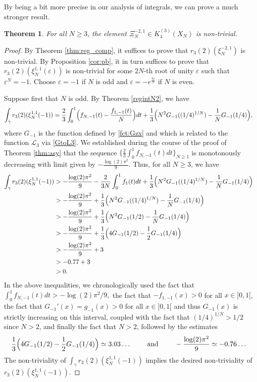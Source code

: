 \documentclass[11pt,a4,leqno]{amsart}
\theoremstyle{my theoremstyle}
\newtheorem{thm}{Theorem}[section]
\theoremstyle{dfn}
\theoremstyle{remark}
\renewcommand{\1}{\mathbbm{1}}
\newcommand{\e}{\varepsilon}
\numberwithin{equation}{section}
\begin{document}
By being a bit more precise in our analysis of integrals, we can prove a much stronger result.

\begin{thm} \label{thm:nontrivial}
    For all $N\geq 3$, the element $\Xi_N^{-2,1} \in K_4^{(3)}(X_N)$ is non-trivial.
\end{thm}

\begin{proof}
    By Theorem \ref{thm:reg_comp}, it suffices to prove that $r_3(2)(\xi^{-2,1}_N)$ is non-trivial. By Proposition \ref{cor:pb}, it in turn suffices to prove that $r_3(2)(\xi^{1,1}_N(\e))$ is non-trivial for some $2N$-th root of unity $\e$ such that $\e^N=-1$. Choose $\e=-1$ if $N$ is odd and $\e=-e^{\frac{\pi i}{N}}$ if $N$ is even.

    Suppose first that $N$ is odd. By Theorem \ref{regintN2}, we have 
    \begin{equation*}
    \int_\gamma r_3(2)(\xi_N^{1,1}(-1))=\frac{2}{3}\int_0^1 \Bigl(f_{N,-1}(t) - \frac{f_{1,-1}(t)}{N}\Bigr)dt+\frac{1}{3}\Bigl( N^2 G_{-1}((1/4)^{1/N}) -\frac{1}{N} G_{-1}(1/4) \Bigr),
\end{equation*}
where $G_{-1}$ is the function defined by \eqref{fct:Gzx} and which is related to the function $\mathcal{L}_3$ via \eqref{GtoL3}.
We established during the course of the proof of Theorem \ref{thm:asy} that the sequence $\{\frac23 \int_0^1 f_{N,-1}(t)dt\}_{N\geq 1}$ is monotonously decreasing with limit given by $-\frac{\log(2)\pi^2}{9}$. Thus, for all $N\geq 3$, we have
\begin{align*}
    \int_\gamma r_3(2)(\xi_N^{1,1}(-1)) & > -\frac{\log(2)\pi^2}{9} -\frac{2}{3N}\int_0^1 f_1(t) dt +\frac{1}{3}\Bigl( N^2 G_{-1}((1/4)^{1/N}) -\frac{1}{N} G_{-1}(1/4) \Bigr) \\
    & > -\frac{\log(2)\pi^2}{9} +\frac{1}{3}\Bigl( N^2 G_{-1}((1/4)^{1/N}) -\frac{1}{N} G_{-1}(1/4) \Bigr) \\
    & > -\frac{\log(2)\pi^2}{9} +\frac{1}{3}\Bigl( N^2 G_{-1}(1/2) -\frac{1}{N} G_{-1}(1/4) \Bigr) \\
    & > -\frac{\log(2)\pi^2}{9} +\frac{1}{3}\Bigl( 4 G_{-1}(1/2) -\frac{1}{2} G_{-1}(1/4) \Bigr) \\
    & > -\frac{\log(2)\pi^2}{9} +3 \\
    & > -0.77 +3 \\
    & > 0.
\end{align*}
In the above inequalities, we chronologically used the fact that $\int_0^1 f_{N,-1}(t)dt > -\log(2)\pi^2/9,$ the fact that $-f_{1,-1}(x)>0$ for all $x\in ]0,1[$, the fact that $G_{-1}'(x)=g_{-1}(x)>0$ for all $x\in ]0,1[$ and thus $G_{-1}(x)$ is strictly increasing on this interval, coupled with the fact that $(1/4)^{1/N}>1/2$ since $N>2$, and finally the fact that $N>2$, followed by the estimates 
\[
\frac{1}{3}\Bigl( 4 G_{-1}(1/2) -\frac{1}{2} G_{-1}(1/4) \Bigr) \simeq 3.03\ldots \qquad \text{ and } \qquad -\frac{\log(2)\pi^2}{9} \simeq -0.76\ldots
\]
The non-triviality of $\int_\gamma r_3(2)(\xi_N^{1,1}(-1))$ implies the desired non-triviality of $r_3(2)(\xi_N^{1,1}(-1))$.


\end{proof}
\end{document}
